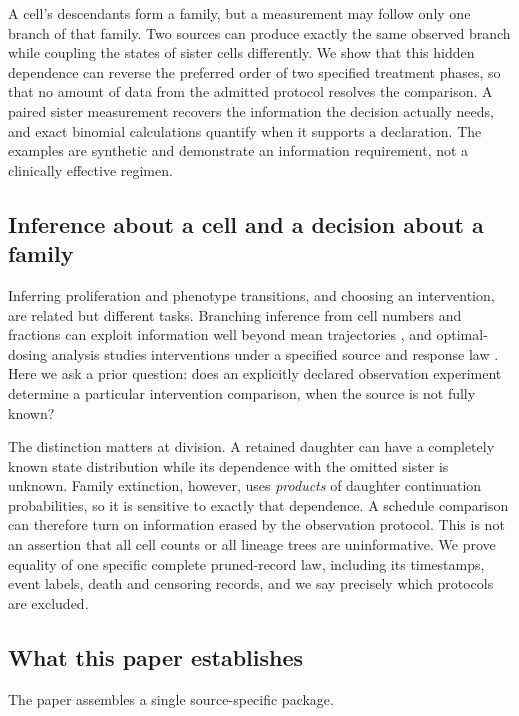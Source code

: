 \documentclass[11pt]{article}
\theoremstyle{plain}
\theoremstyle{definition}
\theoremstyle{remark}
\begin{document}
A cell's descendants form a family, but a measurement may follow only one
branch of that family. Two sources can produce exactly the same observed branch
while coupling the states of sister cells differently. We show that this hidden
dependence can reverse the preferred order of two specified treatment phases,
so that no amount of data from the admitted protocol resolves the comparison. A
paired sister measurement recovers the information the decision actually needs,
and exact binomial calculations quantify when it supports a declaration. The
examples are synthetic and demonstrate an information requirement, not a
clinically effective regimen.

\subsection{Inference about a cell and a decision about a family}

Inferring proliferation and phenotype transitions, and choosing an
intervention, are related but different tasks. Branching inference from cell
numbers and fractions can exploit information well beyond mean trajectories
\citep{GunnarssonFooLeder2023}, and optimal-dosing analysis studies
interventions under a specified source and response law
\citep{GunnarssonMagnussonFoo2025}. Here we ask a prior question: does an
explicitly declared observation experiment determine a particular intervention
comparison, when the source is not fully known?

The distinction matters at division. A retained daughter can have a completely
known state distribution while its dependence with the omitted sister is
unknown. Family extinction, however, uses \emph{products} of daughter
continuation probabilities, so it is sensitive to exactly that dependence. A
schedule comparison can therefore turn on information erased by the observation
protocol. This is not an assertion that all cell counts or all lineage trees are
uninformative. We prove equality of one specific complete pruned-record law,
including its timestamps, event labels, death and censoring records, and we say
precisely which protocols are excluded.

\subsection{What this paper establishes}

The paper assembles a single source-specific package.
\end{document}
